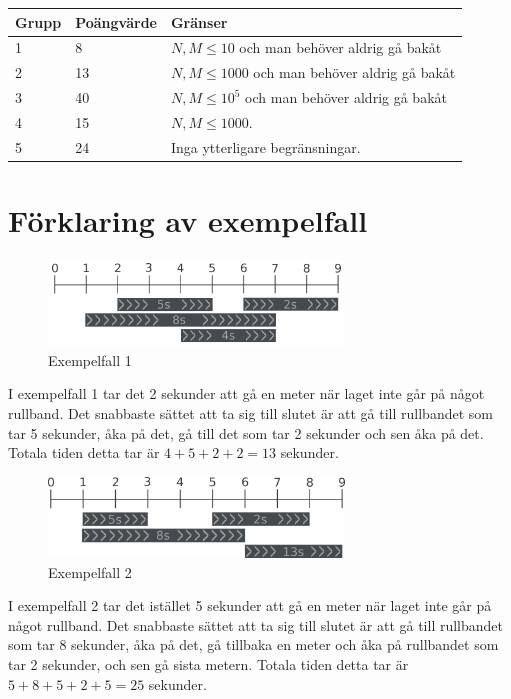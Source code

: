\noindent
\begin{tabular}{| l | l | l |}
\hline
Grupp & Poängvärde & Gränser \\ \hline
1     & 8          &  $N,M \le 10$ och man behöver aldrig gå bakåt\\ \hline
2     & 13         &  $N,M \le 1000$ och man behöver aldrig gå bakåt\\ \hline
3     & 40         &  $N,M \le 10^5$ och man behöver aldrig gå bakåt\\ \hline
4     & 15         &  $N,M \le 1000$. \\ \hline
5     & 24         &  Inga ytterligare begränsningar. \\ \hline
\end{tabular}

\section*{Förklaring av exempelfall}

\begin{figure}[h]
	\centering
\includegraphics[width=0.7\textwidth]{sample1}
\caption{Exempelfall 1}
\end{figure}
I exempelfall 1 tar det 2 sekunder att gå en meter när laget inte går på något rullband.
Det snabbaste sättet att ta sig till slutet är att gå till rullbandet som
tar 5 sekunder, åka på det, gå till det som tar 2 sekunder och sen åka på det.
Totala tiden detta tar är $4+5+2+2=13$ sekunder.



\begin{figure}[h]
	\centering
\includegraphics[width=0.7\textwidth]{sample2}
\caption{Exempelfall 2}
\end{figure}
I exempelfall 2 tar det istället 5 sekunder att gå en meter när laget inte går på något rullband.
Det snabbaste sättet att ta sig till slutet är att gå till rullbandet som
tar 8 sekunder, åka på det, gå tillbaka en meter och åka på
rullbandet som tar 2 sekunder, och sen gå sista metern.
Totala tiden detta tar är $5+8+5+2+5=25$ sekunder.
